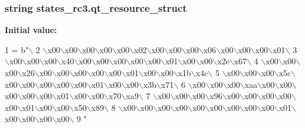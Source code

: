 \subsubsection[{qt\+\_\+resource\+\_\+struct}]{\setlength{\rightskip}{0pt plus 5cm}string states\+\_\+rc3.\+qt\+\_\+resource\+\_\+struct}\label{namespacestates__rc3_a1a5b3a1aebad83bf86ce0315273ac981}
{\bfseries Initial value\+:}
\begin{DoxyCode}
1 = b\textcolor{stringliteral}{"\(\backslash\)}
2 \textcolor{stringliteral}{\(\backslash\)x00\(\backslash\)x00\(\backslash\)x00\(\backslash\)x00\(\backslash\)x00\(\backslash\)x02\(\backslash\)x00\(\backslash\)x00\(\backslash\)x00\(\backslash\)x06\(\backslash\)x00\(\backslash\)x00\(\backslash\)x00\(\backslash\)x01\(\backslash\)}
3 \textcolor{stringliteral}{\(\backslash\)x00\(\backslash\)x00\(\backslash\)x00\(\backslash\)x40\(\backslash\)x00\(\backslash\)x00\(\backslash\)x00\(\backslash\)x00\(\backslash\)x00\(\backslash\)x01\(\backslash\)x00\(\backslash\)x00\(\backslash\)x2e\(\backslash\)x67\(\backslash\)}
4 \textcolor{stringliteral}{\(\backslash\)x00\(\backslash\)x00\(\backslash\)x00\(\backslash\)x26\(\backslash\)x00\(\backslash\)x00\(\backslash\)x00\(\backslash\)x00\(\backslash\)x00\(\backslash\)x01\(\backslash\)x00\(\backslash\)x00\(\backslash\)x1b\(\backslash\)x4c\(\backslash\)}
5 \textcolor{stringliteral}{\(\backslash\)x00\(\backslash\)x00\(\backslash\)x00\(\backslash\)x5c\(\backslash\)x00\(\backslash\)x00\(\backslash\)x00\(\backslash\)x00\(\backslash\)x00\(\backslash\)x01\(\backslash\)x00\(\backslash\)x00\(\backslash\)x3b\(\backslash\)x71\(\backslash\)}
6 \textcolor{stringliteral}{\(\backslash\)x00\(\backslash\)x00\(\backslash\)x00\(\backslash\)xaa\(\backslash\)x00\(\backslash\)x00\(\backslash\)x00\(\backslash\)x00\(\backslash\)x00\(\backslash\)x01\(\backslash\)x00\(\backslash\)x00\(\backslash\)x70\(\backslash\)xa9\(\backslash\)}
7 \textcolor{stringliteral}{\(\backslash\)x00\(\backslash\)x00\(\backslash\)x00\(\backslash\)x96\(\backslash\)x00\(\backslash\)x00\(\backslash\)x00\(\backslash\)x00\(\backslash\)x00\(\backslash\)x01\(\backslash\)x00\(\backslash\)x00\(\backslash\)x50\(\backslash\)x89\(\backslash\)}
8 \textcolor{stringliteral}{\(\backslash\)x00\(\backslash\)x00\(\backslash\)x00\(\backslash\)x00\(\backslash\)x00\(\backslash\)x00\(\backslash\)x00\(\backslash\)x00\(\backslash\)x00\(\backslash\)x01\(\backslash\)x00\(\backslash\)x00\(\backslash\)x00\(\backslash\)x00\(\backslash\)}
9 \textcolor{stringliteral}{"}
\end{DoxyCode}
